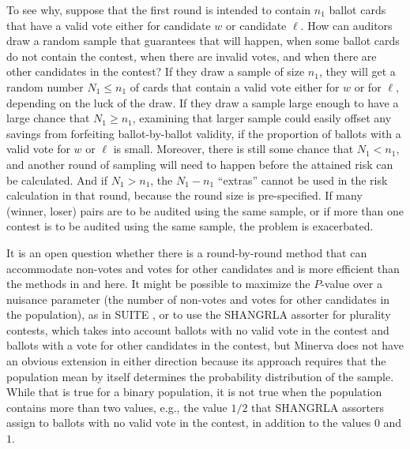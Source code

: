 \documentclass[12pt,runningheads]{llncs}
\begin{document}
{To see why, suppose that the first round is intended to contain $n_1$ ballot cards that have a valid vote either
for candidate $w$ or candidate $\ell$.  
How can auditors draw a random sample that guarantees that will happen, when some ballot cards do not contain
the contest, when there are invalid votes, and when there are other candidates in the contest?
If they draw a sample of size $n_1$, they will get a random number $N_1 \le n_1$ of cards that contain a valid vote either
for $w$ or for $\ell$, depending on the luck of the draw.
If they draw a sample large enough to have a large chance that $N_1 \ge n_1$, examining that larger sample could easily 
offset any savings from forfeiting ballot-by-ballot validity, if the proportion of ballots with a valid vote for $w$ or $\ell$ is
small.
Moreover, there is still some chance that $N_1 < n_1$, and another round of sampling will need to happen before the attained risk can be calculated.
And if $N_1 > n_1$, the $N_1-n_1$ ``extras'' cannot be used in the risk calculation in that round, because the round size is pre-specified.
If many (winner, loser) pairs are to be audited using the same sample, or if more than one contest is to be audited
using the same sample, the problem is exacerbated.

It is an open question whether there is a round-by-round method that can accommodate non-votes and votes
for other candidates and is more efficient than the methods in \cite{waudby-smithEtal21,stark20} and here.
It might be possible to maximize the $P$-value over a nuisance parameter (the number of non-votes and votes
for other candidates in the population), as in SUITE \cite{ottoboniEtal18}, or to use the SHANGRLA assorter
for plurality contests, which takes into account ballots with no valid vote in the contest and ballots with
a vote for other candidates in the contest, but Minerva does not have an obvious extension in either direction
because its approach requires that the population mean by itself determines the probability distribution of
the sample.
While that is true for a binary population, it is not true when the population contains more than two values, e.g., the value $1/2$ that
SHANGRLA assorters assign to ballots with no valid vote in the contest, in addition to the values $0$ and $1$.

}
\end{document}
